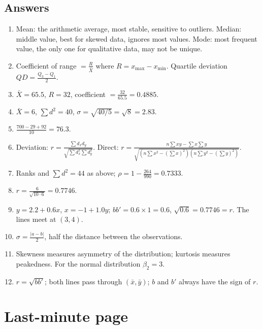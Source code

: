 \documentclass[11pt,a4paper]{article}
\begin{document}
\subsection*{Answers}
\begin{enumerate}
\item Mean: the arithmetic average, most stable, sensitive to outliers. Median: middle value, best for skewed data, ignores most values. Mode: most frequent value, the only one for qualitative data, may not be unique.
\item Coefficient of range $=\frac{R}{\bar X}$ where $R=x_{\max}-x_{\min}$. Quartile deviation $QD=\frac{Q_3-Q_1}{2}$.
\item $\bar X=65.5$, $R=32$, coefficient $=\frac{32}{65.5}=\boxed{0.4885}$.
\item $\bar X=6$, $\sum d^2=40$, $\sigma=\sqrt{40/5}=\sqrt8=\boxed{2.83}$.
\item $\frac{700-29+92}{10}=\boxed{76.3}$.
\item Deviation: $r=\frac{\sum d_xd_y}{\sqrt{\sum d_x^2\sum d_y^2}}$. Direct: $r=\frac{n\sum xy-\sum x\sum y}{\sqrt{(n\sum x^2-(\sum x)^2)(n\sum y^2-(\sum y)^2)}}$.
\item Ranks and $\sum d^2=44$ as above; $\rho=1-\frac{264}{990}=\boxed{0.7333}$.
\item $r=\frac{6}{\sqrt{10\cdot6}}=\boxed{0.7746}$.
\item $y=2.2+0.6x$, $x=-1+1.0y$; $bb'=0.6\times1=0.6$, $\sqrt{0.6}=0.7746=r$. The lines meet at $(3,4)$.
\item $\sigma=\frac{|a-b|}{2}$, half the distance between the observations.
\item Skewness measures asymmetry of the distribution; kurtosis measures peakedness. For the normal distribution $\beta_2=3$.
\item $r=\sqrt{bb'}$; both lines pass through $(\bar x,\bar y)$; $b$ and $b'$ always have the sign of $r$.
\end{enumerate}

\section{Last-minute page}
\end{document}
